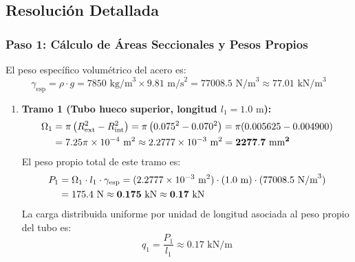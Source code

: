 \subsection*{Resolución Detallada}

\subsubsection*{Paso 1: Cálculo de Áreas Seccionales y Pesos Propios}
El peso específico volumétrico del acero es:
\begin{equation}
    \gamma_{\text{esp}} = \rho \cdot g = 7850\text{ kg/m}^3 \times 9.81\text{ m/s}^2 = 77008.5\text{ N/m}^3 \approx 77.01\text{ kN/m}^3
\end{equation}

\begin{enumerate}
    \item \textbf{Tramo 1 (Tubo hueco superior, longitud $l_1 = 1.0\text{ m}$):}
          \begin{align}
              \Omega_1 & = \pi \left( R_{\text{ext}}^2 - R_{\text{int}}^2 \right) = \pi \left( 0.075^2 - 0.070^2 \right) = \pi (0.005625 - 0.004900) \notag \\
                       & = 7.25\pi \times 10^{-4}\text{ m}^2 \approx 2.2777 \times 10^{-3}\text{ m}^2 = \mathbf{2277.7\text{ mm}^2}
          \end{align}
          El peso propio total de este tramo es:
          \begin{align}
              P_1 & = \Omega_1 \cdot l_1 \cdot \gamma_{\text{esp}} = (2.2777 \times 10^{-3}\text{ m}^2) \cdot (1.0\text{ m}) \cdot (77008.5\text{ N/m}^3) \notag \\
                  & = 175.4\text{ N} \approx \mathbf{0.175\text{ kN} \approx 0.17\text{ kN}}
          \end{align}
          La carga distribuida uniforme por unidad de longitud asociada al peso propio del tubo es:
          \begin{equation}
              q_1 = \frac{P_1}{l_1} \approx 0.17\text{ kN/m}
          \end{equation}


\end{enumerate}
